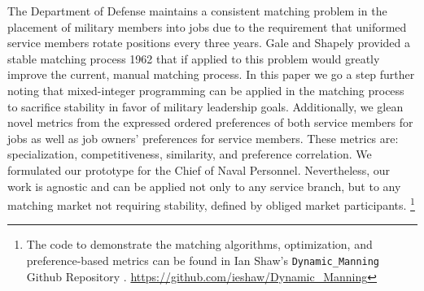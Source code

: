 The Department of Defense maintains a consistent matching problem in the placement of military members into jobs due to the requirement that uniformed service members rotate positions every three years. Gale and Shapely provided a stable matching process 1962 \cite{1962_Gale} that if applied to this problem would greatly improve the current, manual matching process. In this paper we go a step further noting that mixed-integer programming can be applied in the matching process to sacrifice stability in favor of military leadership goals. Additionally, we glean novel metrics from the expressed ordered preferences of both service members for jobs as well as job owners’ preferences for service members. These metrics are: specialization, competitiveness, similarity, and preference correlation. We formulated our prototype for the Chief of Naval Personnel. Nevertheless, our work is agnostic and can be applied not only to any service branch, but to any matching market not requiring stability, defined by obliged market participants.  \footnote{The code to demonstrate the matching algorithms, optimization, and preference-based metrics can be found in Ian Shaw's \texttt{Dynamic\_Manning} Github Repository . \url{https://github.com/ieshaw/Dynamic_Manning}}
